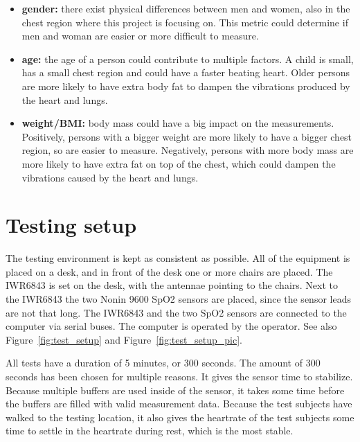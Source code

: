 \begin{itemize}
    \item \textbf{gender:} there exist physical differences between men and women, also in the chest region where this project is focusing on. This metric could determine if men and woman are easier or more difficult to measure.
    \item \textbf{age:} the age of a person could contribute to multiple factors. A child is small, has a small chest region and could have a faster beating heart. Older persons are more likely to have extra body fat to dampen the vibrations produced by the heart and lungs.
    \item \textbf{weight/BMI:} body mass could have a big impact on the measurements. Positively, persons with a bigger weight are more likely to have a bigger chest region, so are easier to measure. Negatively, persons with more body mass are more likely to have extra fat on top of the chest, which could dampen the vibrations caused by the heart and lungs.
\end{itemize}

\section{Testing setup}
\label{sec:test_setup}
The testing environment is kept as consistent as possible. All of the equipment is placed on a desk, and in front of the desk one or more chairs are placed. The IWR6843 is set on the desk, with the antennae pointing to the chairs. Next to the IWR6843 the two Nonin 9600 SpO2 sensors are placed, since the sensor leads are not that long. The IWR6843 and the two SpO2 sensors are connected to the computer via serial buses. The computer is operated by the operator. See also Figure~\ref{fig:test_setup} and Figure~\ref{fig:test_setup_pic}.

All tests have a duration of 5 minutes, or 300 seconds. The amount of 300 seconds has been chosen for multiple reasons. It gives the sensor time to stabilize. Because multiple buffers are used inside of the sensor, it takes some time before the buffers are filled with valid measurement data. Because the test subjects have walked to the testing location, it also gives the heartrate of the test subjects some time to settle in the heartrate during rest, which is the most stable.

